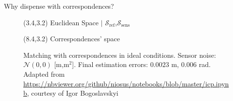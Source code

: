 \begin{frame}[noframenumbering]{Why dispense with correspondences?}


  \begin{figure}\vspace{1cm}
    \caption{Matching with correspondences in ideal conditions. Sensor noise:
             $\mathcal{N}(0,0)$ [m,m$^2$]. Final estimation errors: $0.0023$ m, $0.006$
             rad. Adapted from
             \url{https://nbviewer.org/github/niosus/notebooks/blob/master/icp.ipynb},
             courtesy of Igor Bogoslavskyi}
    \begin{textblock}{5}(3.4,3.2)
      \scriptsize Euclidean Space $|$ \textcolor{r}{$\mathcal{S}_{\text{ref}}$},\textcolor{b}{$\mathcal{S}_{\text{sens}}$}
    \end{textblock}
    \begin{textblock}{4}(8.4,3.2)
      \scriptsize Correspondences' space
    \end{textblock}
  \end{figure}

\end{frame}
